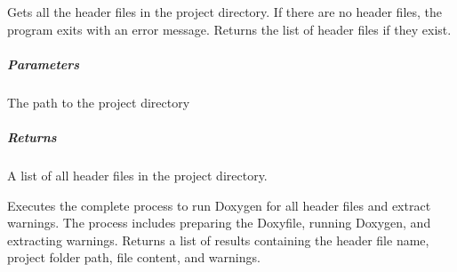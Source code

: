 \documentclass[letterpaper,10pt,english]{sphinxmanual}
\begin{document}
\begin{fulllineitems}

\begin{fulllineitems}
\label{\detokenize{main.doxygen_management:main.doxygen_management.doxy_warning_detector.DoxyWarningDetector.get_all_header_files}}
\pysigstartsignatures
{}
\pysigstopsignatures
\sphinxAtStartPar
Gets all the header files in the project directory.
If there are no header files, the program exits with an error message.
Returns the list of header files if they exist.


\subparagraph{Parameters}
\label{\detokenize{main.doxygen_management:id2}}\begin{description}
\sphinxAtStartPar
The path to the project directory

\end{description}


\subparagraph{Returns}
\label{\detokenize{main.doxygen_management:id3}}\begin{description}
\sphinxAtStartPar
A list of all header files in the project directory.

\end{description}

\end{fulllineitems}


\begin{fulllineitems}
\label{\detokenize{main.doxygen_management:main.doxygen_management.doxy_warning_detector.DoxyWarningDetector.run_doxygen}}
\pysigstartsignatures
{}
\pysigstopsignatures
\sphinxAtStartPar
Executes the complete process to run Doxygen for all header files and extract warnings.
The process includes preparing the Doxyfile, running Doxygen, and extracting warnings.
Returns a list of results containing the header file name, project folder path, file content, and warnings.



\end{fulllineitems}
\end{fulllineitems}
\end{document}
